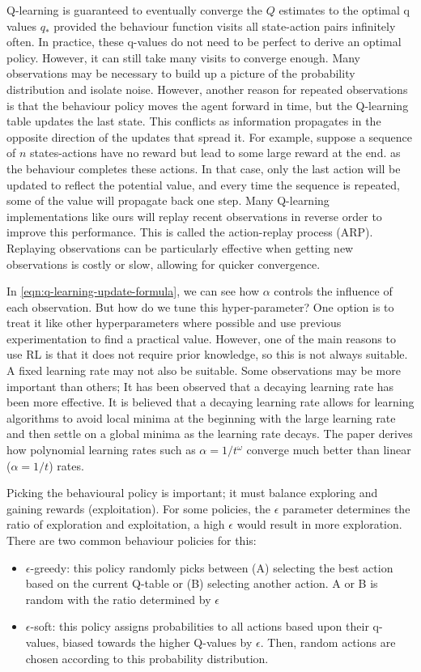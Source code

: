 \documentclass[]{final_report}
\begin{document}
Q-learning is guaranteed to eventually converge the $Q$ estimates to the optimal q values $q_\ast$ provided the behaviour function visits all state-action pairs infinitely often. In practice, these q-values do not need to be perfect to derive an optimal policy. However, it can still take many visits to converge enough. Many observations may be necessary to build up a picture of the probability distribution and isolate noise. However, another reason for repeated observations is that the behaviour policy moves the agent forward in time, but the Q-learning table updates the last state. This conflicts as information propagates in the opposite direction of the updates that spread it. For example, suppose a sequence of $n$ states-actions have no reward but lead to some large reward at the end. as the behaviour completes these actions. In that case, only the last action will be updated to reflect the potential value, and every time the sequence is repeated, some of the value will propagate back one step. Many Q-learning implementations like ours will replay recent observations in reverse order to improve this performance. This is called the action-replay process (ARP). Replaying observations can be particularly effective when getting new observations is costly or slow, allowing for quicker convergence.


In \ref{eqn:q-learning-update-formula}, we can see how $\alpha$ controls the influence of each observation. But how do we tune this hyper-parameter? One option is to treat it like other hyperparameters where possible and use previous experimentation to find a practical value. However, one of the main reasons to use RL is that it does not require prior knowledge, so this is not always suitable. A fixed learning rate may not also be suitable. Some observations may be more important than others; It has been observed that a decaying learning rate has been more effective. It is believed that a decaying learning rate allows for learning algorithms to avoid local minima at the beginning with the large learning rate and then settle on a global minima as the learning rate decays\cite{decayingLearningRates}. The paper \cite{even2003learning} derives how polynomial learning rates such as $\alpha = 1/t^\omega$ converge much better than linear ($\alpha = 1/t$) rates.

Picking the behavioural policy is important; it must balance exploring and gaining rewards (exploitation). For some policies, the $\epsilon$ parameter determines the ratio of exploration and exploitation, a high $\epsilon$ would result in more exploration. There are two common behaviour policies for this:
\begin{itemize}
  \item $\epsilon$-greedy: this policy randomly picks between (A) selecting the best action based on the current Q-table or (B) selecting another action. A or B is random with the ratio determined by $\epsilon$
  \item $\epsilon$-soft: this policy assigns probabilities to all actions based upon their q-values, biased towards the higher Q-values by $\epsilon$. Then, random actions are chosen according to this probability distribution.
\end{itemize}
\end{document}
